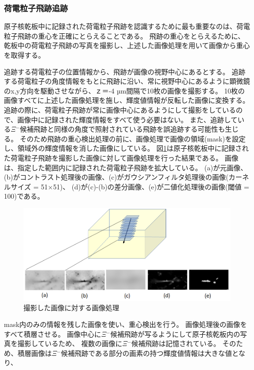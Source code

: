 \documentclass[12pt,a4paper]{jarticle}
\begin{document}
\subsubsection{荷電粒子飛跡追跡}
原子核乾板中に記録された荷電粒子飛跡を認識するために最も重要なのは、荷電粒子飛跡の重心を正確にとらえることである。
飛跡の重心をとらえるために、乾板中の荷電粒子飛跡の写真を撮影し、上述した画像処理を用いて画像から重心を取得する。
\par
追跡する荷電粒子の位置情報から、飛跡が画像の視野中心にあるとする。
追跡する荷電粒子の角度情報をもとに飛跡に沿い、常に視野中心にあるように顕微鏡のx,y方向を駆動させながら、ｚ＝-4 µm間隔で10枚の画像を撮影する。
10枚の画像すべてに上述した画像処理を施し、輝度値情報が反転した画像に変換する。
追跡の際に、荷電粒子飛跡が常に画像中心にあるようにして撮影をしているので、画像中に記録された輝度情報をすべて使う必要はない。
また、追跡している$\Xi$$^-$候補飛跡と同様の角度で照射されている飛跡を誤追跡する可能性も生じる。
そのため飛跡の重心検出処理の前に、画像処理で画像の領域(mask)を設定し、領域外の輝度情報を消した画像にしている。
図\ref{fig:tuiseki_gazou}は原子核乾板中に記録された荷電粒子飛跡を撮影した画像に対して画像処理を行った結果である。
画像は、指定した範囲内に記録された荷電粒子飛跡を拡大している。
(a)が元画像、(b)がコントラスト処理後の画像、(c)がガウシアンフィルタ処理後の画像(カーネルサイズ = 51×51)、
(d)が(c)-(b)の差分画像、(e)が二値化処理後の画像(閾値 = 100)である。
\begin{figure}[htbp]
  \centering
     \includegraphics[width=140mm]{tuiseki_gazou.png}
  \caption{撮影した画像に対する画像処理\label{fig:tuiseki_gazou}}
\end{figure}
\par
mask内のみの情報を残した画像を使い、重心検出を行う。
画像処理後の画像をすべて積層させる。
画像中心に$\Xi$$^-$候補飛跡が写るようにして原子核乾板内の写真を撮影しているため、
複数の画像に$\Xi$$^-$候補飛跡は記憶されている。
そのため、積層画像は$\Xi$$^-$候補飛跡である部分の画素の持つ輝度値情報は大きな値となり、
\end{document}
